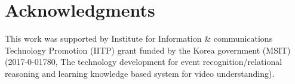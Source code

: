 
\section*{Acknowledgments}
This work was supported by Institute for Information \& communications Technology Promotion (IITP) grant funded by the Korea government (MSIT) (2017-0-01780, The technology development for event recognition/relational reasoning and learning knowledge based system for video understanding).


